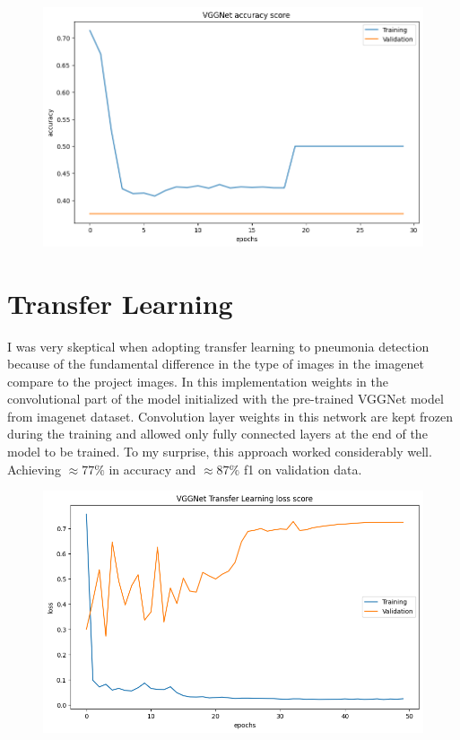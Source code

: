 \begin{figure}[H]
    \centering
    \includegraphics[width=.8\textwidth]{img/vggnetaccuracy.png}
    \caption{}
    \label{fig:vggacc}
\end{figure}


\section{Transfer Learning}
I was very skeptical when adopting transfer learning to pneumonia detection because of the fundamental difference in the type of images in the imagenet compare to the project images.
In this implementation weights in the convolutional part of the model initialized with the pre-trained VGGNet model from imagenet dataset.
Convolution layer weights in this network are kept frozen during the training and allowed only fully connected layers at the end of the model to be trained.
To my surprise, this approach worked considerably well. Achieving $\approx 77 \%$ in accuracy and $\approx 87 \%$ f1 on validation data. 

\begin{figure}[H]
    \centering
    \includegraphics[width=.8\textwidth]{img/vggnettfloss.png}
    \caption{}
    \label{fig:vggtfloss}
\end{figure}

